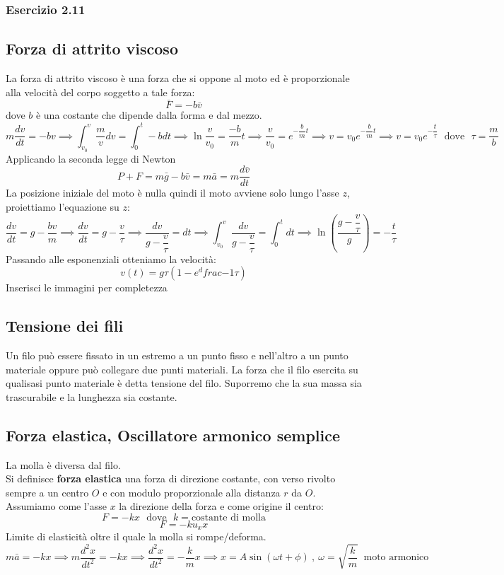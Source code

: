 \documentclass[../../main.tex]{subfiles}
\begin{document}
\subsubsection{Esercizio 2.11}

\subsection{Forza di attrito viscoso}
La forza di attrito viscoso è una forza che si oppone al moto ed è proporzionale alla velocità del corpo soggetto a tale forza:
\[
    \bar F = -b\bar v
\]
dove $b$ è una costante che dipende dalla forma e dal mezzo.
\[
    m\dfrac{dv}{dt} = -b v \implies \int_{v_0}^{v}\dfrac{m}{v} dv = \int_{0}^{t} -b dt \implies \ln\dfrac{v}{v_0} = \dfrac{-b}{m}t \implies \dfrac{v}{v_0} = e^{-\dfrac{b}{m}t} \implies v = v_0 e^{-\dfrac{b}{m}t} \implies v = v_0 e^{-\dfrac{t}{\tau}} \ \ \ \text{dove} \ \ \ \tau = \dfrac{m}{b}
\]
Applicando la seconda legge di Newton
\[
    P + F = m\bar g - b\bar v = m\bar a = m\dfrac{d\bar v}{dt}
\]
La posizione iniziale del moto è nulla quindi il moto avviene solo lungo l'asse $z$, proiettiamo l'equazione su $z$:
\[
    \dfrac{dv}{dt} = g - \dfrac{bv}{m} \implies \dfrac{dv}{dt} = g - \dfrac{v}{\tau} \implies \dfrac{dv}{g - \dfrac{v}{\tau}} = dt \implies \int_{v_0}^{v} \dfrac{dv}{g - \dfrac{v}{\tau}} = \int_{0}^{t} dt \implies \ln\left(\dfrac{g- \dfrac{v}{\tau}}{g}\right) = -\dfrac{t}{\tau}
\]
Passando alle esponenziali otteniamo la velocità:
\[
    v(t) = g\tau\left(1-e^dfrac{-1}{\tau}\right)
\]
Inserisci le immagini per completezza
\subsection{Tensione dei fili}
Un filo può essere fissato in un estremo a un punto fisso e nell’altro a un punto materiale oppure può collegare due punti materiali. La forza che il filo esercita su qualisasi punto materiale è detta tensione del filo. Suporremo che la sua massa sia trascurabile e la lunghezza sia costante.

\subsection{Forza elastica, Oscillatore armonico semplice}
La molla è diversa dal filo. \\
Si definisce \textbf{forza elastica} una forza di direzione costante, con verso rivolto sempre a un centro $O$ e con modulo proporzionale alla distanza $r$ da $O$. Assumiamo come l'asse $x$ la direzione della forza e come origine il centro:
\[
    F = -kx \ \ \ \text{dove} \ \ \ k = \text{costante di molla}
\]
\[
    F = -ku_xx
\]
Limite di elasticità oltre il quale la molla si rompe/deforma.
\[
    m\bar a = -kx \implies m\dfrac{d^2x}{dt^2} = -kx \implies \dfrac{d^2x}{dt^2} = - \dfrac{k}{m}x \implies x = A\sin(\omega t + \phi) \ , \ \omega = \sqrt{\dfrac{k}{m}} \ \text{ moto armonico}
\]
\end{document}

